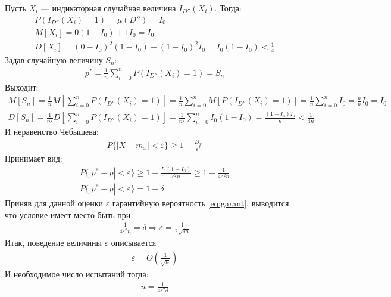 Пусть \(X_i\) --- индикаторная случайная величина \(I_{D''}(X_i)\). Тогда:
\begin{align}
	P(I_{D''}(X_i)=1) = \mu(D'') = I_0 \\
	M[X_i] = 0(1 - I_0) + 1 I_0 = I_0  \\
	D[X_i] = (0 - I_0)^2 (1 - I_0) + (1 - I_0)^2 I_0 = I_0(1-I_0) < \frac{1}{4}
\end{align}
Задав случайную величину \(S_n\):
\begin{align}
	p^* = \frac{1}{n}\sum_{i=0}^n P(I_{D''}(X_i) = 1) = S_n
\end{align}
Выходит:
\begin{align}
	M[S_n] = \frac{1}{n}M[\sum_{i=0}^n P(I_{D''}(X_i) = 1)] = \frac{1}{n}\sum_{i=0}^n M[P(I_{D''}(X_i) = 1)] = \frac{1}{n}\sum_{i=0}^n I_0 = \frac{n}{n}I_0 = I_0 \\
	D[S_n] = \frac{1}{n^2}D[\sum_{i=0}^n P(I_{D''}(X_i) = 1)] =  \frac{1}{n^2}\sum_{i=0}^n I_0(1-I_0) = \frac{(1 - I_0)I_0}{n} < \frac{1}{4n}
\end{align}
И неравенство Чебышева:
\begin{align}
	P\{|X-m_x|<\varepsilon\} \geq 1 - \frac{D_x}{\varepsilon^2}
\end{align}
Принимает вид:
\begin{align}
	P\{|p^* - p|<\varepsilon\} \geq 1 - \frac{I_0(1-I_0)}{\varepsilon^2 n} \geq 1 - \frac{1}{4 \varepsilon^2 n} \\
	\label{eq:garant}
	P\{|p^* - p|<\varepsilon\} = 1 - \delta
\end{align}
Приняв для данной оценки \(\varepsilon\) гарантийную вероятность \cref{eq:garant}, выводится, что условие имеет место быть при
\begin{align}
	\frac{1}{4 \varepsilon^2 n} = \delta \Longrightarrow \varepsilon = \frac{1}{2\sqrt{\delta n}}
\end{align}
Итак, поведение величины \(\varepsilon\) описывается
\begin{align}
	\varepsilon = O(\frac{1}{\sqrt{n}})
\end{align}
И необходимое число испытаний тогда:
\begin{align}
	n = \frac{1}{4 \varepsilon^2 \delta}
\end{align}
